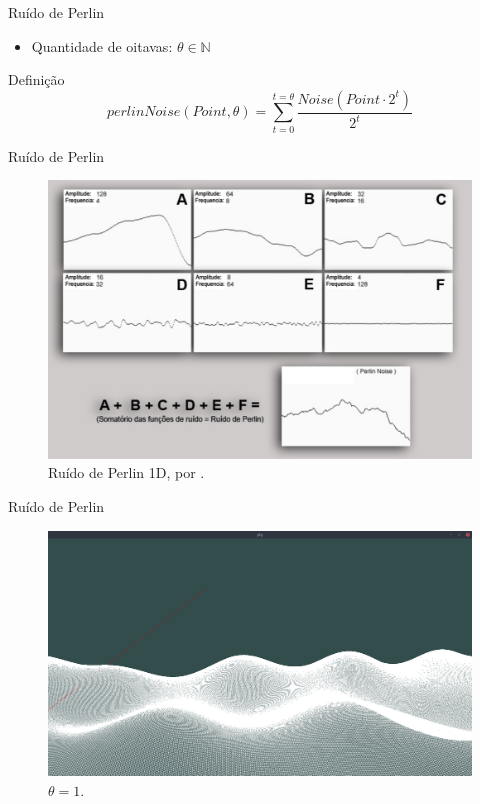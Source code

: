 \begin{frame}{Ruído de Perlin}
    \begin{itemize}
        \item Quantidade de oitavas: $\theta \in \mathbb{N}$
    \end{itemize}
    
    \begin{block}{Definição}
        $$perlinNoise(Point, \theta) = \sum_{t=0}^{t=\theta} \frac{Noise(Point \cdot 2^{t})}{2^{t}}$$
    \end{block}
\end{frame}


\begin{frame}{Ruído de Perlin}
    \begin{figure}
		\centering
        \includegraphics[width=.7\textwidth]{img/explain/perlin1d.png}
        \caption{Ruído de Perlin 1D, por \cite{elias2000perlin}.}
    \end{figure}
\end{frame}

\begin{frame}{Ruído de Perlin}
    \begin{figure}
		\centering
        \includegraphics[width=.7\textwidth]{img/explain/octaves1.png}
        \caption{$\theta = 1$.}
    \end{figure}
\end{frame}

